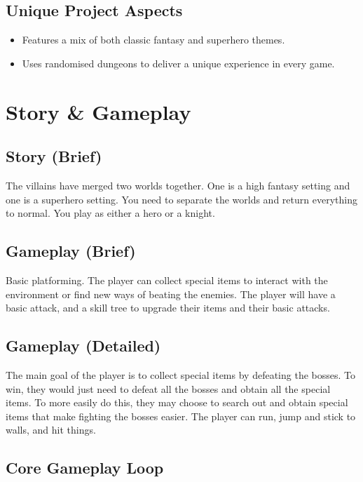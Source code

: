 \documentclass[titlepage]{article}
\begin{document}
\subsection{Unique Project Aspects}
\begin{itemize}
	\item Features a mix of both classic fantasy and superhero themes.
	\item Uses randomised dungeons to deliver a unique experience in every game.
\end{itemize}

\section{Story \& Gameplay}
\subsection*{Story (Brief)}
The villains have merged two worlds together. One is a high fantasy setting and
one is a superhero setting. You need to separate the worlds and return
everything to normal. You play as either a hero or a knight. 

\subsection*{Gameplay (Brief)}
Basic platforming. The player can collect special items to interact with the
environment or find new ways of beating the enemies. The player will have a
basic attack, and a skill tree to upgrade their items and their basic attacks.  

\subsection*{Gameplay (Detailed)}
The main goal of the player is to collect special items by defeating the bosses.
To win, they would just need to defeat all the bosses and obtain all the special items.
To more easily do this, they may choose to search out and obtain special items that
make fighting the bosses easier. The player can run, jump and stick to walls, and hit
things.

\subsection*{Core Gameplay Loop}
\end{document}
